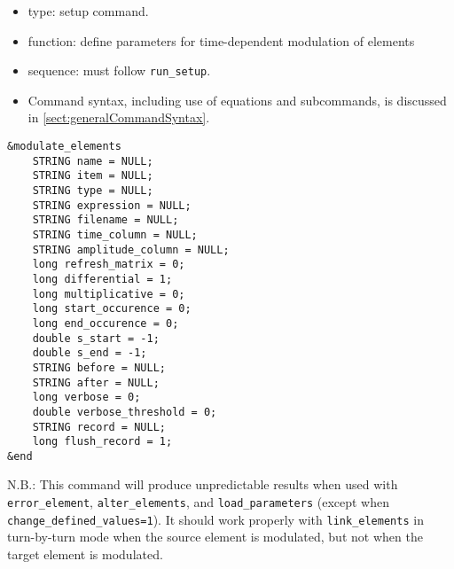 \documentclass[11pt]{article}
\begin{document}
\begin{itemize}
\item type: setup command.
\item function: define parameters for time-dependent modulation of elements
\item sequence: must follow \verb|run_setup|.
\item Command syntax, including use of equations and subcommands, is discussed in \ref{sect:generalCommandSyntax}.
\end{itemize}

\begin{verbatim}
&modulate_elements
    STRING name = NULL;
    STRING item = NULL;
    STRING type = NULL;
    STRING expression = NULL;
    STRING filename = NULL;
    STRING time_column = NULL;
    STRING amplitude_column = NULL;
    long refresh_matrix = 0;
    long differential = 1;
    long multiplicative = 0;
    long start_occurence = 0;
    long end_occurence = 0;
    double s_start = -1;
    double s_end = -1;
    STRING before = NULL;
    STRING after = NULL;
    long verbose = 0;
    double verbose_threshold = 0;
    STRING record = NULL;
    long flush_record = 1;
&end
\end{verbatim}

N.B.: This command will produce unpredictable results when used with
\verb|error_element|, \verb|alter_elements|, and
\verb|load_parameters| (except when \verb|change_defined_values=1|).
It should work properly with \verb|link_elements| in turn-by-turn mode
when the source element is modulated, but not when the target element
is modulated.
\end{document}
